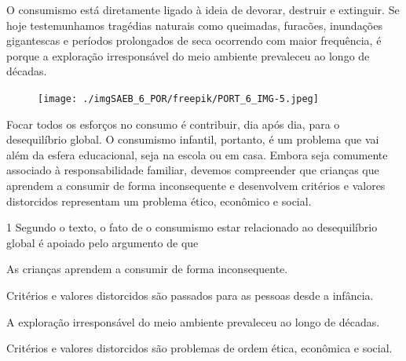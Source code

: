 \begin{myquote}
O consumismo está diretamente ligado à ideia de devorar, destruir e
extinguir. Se hoje testemunhamos tragédias naturais como queimadas,
furacões, inundações gigantescas e períodos prolongados de seca
ocorrendo com maior frequência, é porque a exploração irresponsável do
meio ambiente prevaleceu ao longo de décadas.
\begin{figure}[H]
\centering\texttt{[image: ./imgSAEB\_6\_POR/freepik/PORT\_6\_IMG-5.jpeg]}
\end{figure}
Focar todos os esforços no consumo é contribuir, dia após dia, para o
desequilíbrio global. O consumismo infantil, portanto, é um problema que
vai além da esfera educacional, seja na escola ou em casa. Embora seja
comumente associado à responsabilidade familiar, devemos compreender que
crianças que aprendem a consumir de forma inconsequente e desenvolvem
critérios e valores distorcidos representam um problema ético, econômico
e social.


\end{myquote}

\num{1} Segundo o texto, o fato de o consumismo estar relacionado ao
desequilíbrio global é apoiado pelo argumento de que

\begin{escolha}
\item As crianças aprendem a consumir de forma inconsequente.
\item Critérios e valores distorcidos são passados para as pessoas desde a
infância.
\item A exploração irresponsável do meio ambiente prevaleceu ao longo de
décadas.
\item Critérios e valores distorcidos são problemas de ordem ética,
econômica e social.
\end{escolha}


